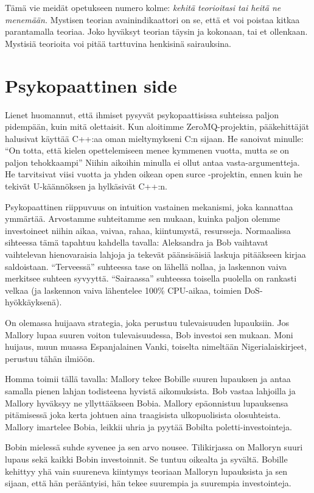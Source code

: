 Tämä vie meidät opetukseen numero kolme: \emph{kehitä teorioitasi tai heitä ne menemään.} Mystisen teorian avainindikaattori on se, että et voi poistaa kitkaa parantamalla teoriaa. Joko hyväksyt teorian täysin ja kokonaan, tai et ollenkaan. Mystisiä teorioita voi pitää tarttuvina henkisinä sairauksina.

\section{Psykopaattinen side}

Lienet huomannut, että ihmiset pysyvät psykopaattisissa suhteissa paljon pidempään, kuin mitä olettaisit. Kun aloitimme ZeroMQ-projektin, pääkehittäjät halusivat käyttää C++:aa oman mieltymykseni C:n sijaan. He sanoivat minulle: ``On totta, että kielen opettelemiseen menee kymmenen vuotta, mutta se on paljon tehokkaampi'' Niihin aikoihin minulla ei ollut antaa vasta-argumentteja. He tarvitsivat viisi vuotta ja yhden oikean open surce -projektin, ennen kuin he tekivät U-käännöksen ja hylkäsivät C++:n.

Psykopaattinen riippuvuus on intuition vastainen mekanismi, joka kannattaa ymmärtää. Arvostamme suhteitamme sen mukaan, kuinka paljon olemme investoineet niihin aikaa, vaivaa, rahaa, kiintumystä, resursseja. Normaalissa sihteessa tämä tapahtuu kahdella tavalla: Aleksandra ja Bob vaihtavat vaihtelevan hienovaraisia lahjoja ja tekevät päänsisäisiä laskuja pitääkseen kirjaa saldoistaan. ``Terveessä'' suhteessa tase on lähellä nollaa, ja laskennon vaiva merkitsee suhteen syvyyttä. ``Sairaassa'' suhteessa toisella puolella on rankasti velkaa (ja laskennon vaiva lähentelee 100\% CPU-aikaa, toimien DoS-hyökkäyksenä).

On olemassa huijaava strategia, joka perustuu tulevaisuuden lupauksiin. Jos Mallory lupaa suuren voiton tulevaisuudessa, Bob investoi sen mukaan. Moni huijaus, muun muassa Espanjalainen Vanki, toiselta nimeltään Nigerialaiskirjeet, perustuu tähän ilmiöön.

Homma toimii tällä tavalla: Mallory tekee Bobille suuren lupauksen ja antaa samalla pienen lahjan todisteena hyvistä aikomuksista. Bob vastaa lahjoilla ja Mallory hyväksyy ne yllyttääkseen Bobia. Mallory epäonnistuu lupauksensa pitämisessä joka kerta johtuen aina traagisista ulkopuolisista olosuhteista. Mallory imartelee Bobia, leikkii uhria ja pyytää Bobilta poletti-investointeja.

Bobin mielessä suhde syvenee ja sen arvo nousee. Tilikirjassa on Malloryn suuri lupaus sekä kaikki Bobin investoinnit. Se tuntuu oikealta ja syvältä. Bobille kehittyy yhä vain suureneva kiintymys teoriaan Malloryn lupauksista ja sen sijaan, että hän perääntyisi, hän tekee suurempia ja suurempia investointeja.

